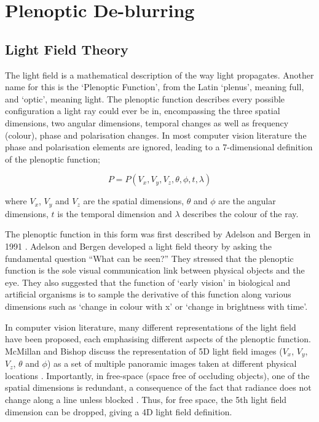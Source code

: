 
\chapter{Plenoptic De-blurring}
\label{chap:plenoptic_deblurring}

\section{Light Field Theory}
\label{sec:light_field_theory}

The light field is a mathematical description of the way light propagates.
Another name for this is the \enquote*{Plenoptic Function}, from the Latin \enquote*{plenus}, meaning full, and \enquote*{optic}, meaning light.
The plenoptic function describes every possible configuration a light ray could ever be in, encompassing the three spatial dimensions, two angular dimensions, temporal changes as well as frequency (colour), phase and polarisation changes.
In most computer vision literature the phase and polarisation elements are ignored, leading to a 7-dimensional definition of the plenoptic function;

\begin{equation}
\label{eq:plenoptic_function}
P = P(V_x, V_y, V_z, \theta, \phi, t, \lambda)
\end{equation}

where $V_x$, $V_y$ and $V_z$ are the spatial dimensions, $\theta$ and $\phi$ are the angular dimensions, $t$ is the temporal dimension and $\lambda$ describes the colour of the ray. 

The plenoptic function in this form was first described by Adelson and Bergen in 1991 \cite{adelson1991plenoptic}.
Adelson and Bergen developed a light field theory by asking the fundamental question \enquote{What can be seen?} They stressed that the plenoptic function is the sole visual communication link between physical objects and the eye.
They also suggested that the function of \enquote*{early vision} in biological and artificial organisms is to sample the derivative of this function along various dimensions such as \enquote*{change in colour with x} or \enquote*{change in brightness with time}.

In computer vision literature, many different representations of the light field have been proposed, each emphasising different aspects of the plenoptic function.
McMillan and Bishop discuss the representation of 5D light field images ($V_x$, $V_y$, $V_z$, $\theta$ and $\phi$) as a set of multiple panoramic images taken at different physical locations \cite{mcmillan1995plenoptic}.
Importantly, in free-space (space free of occluding objects), one of the spatial dimensions is redundant, a consequence of the fact that radiance does not change along a line unless blocked \cite{levoy1996light}.
Thus, for free space, the 5th light field dimension can be dropped, giving a 4D light field definition.

